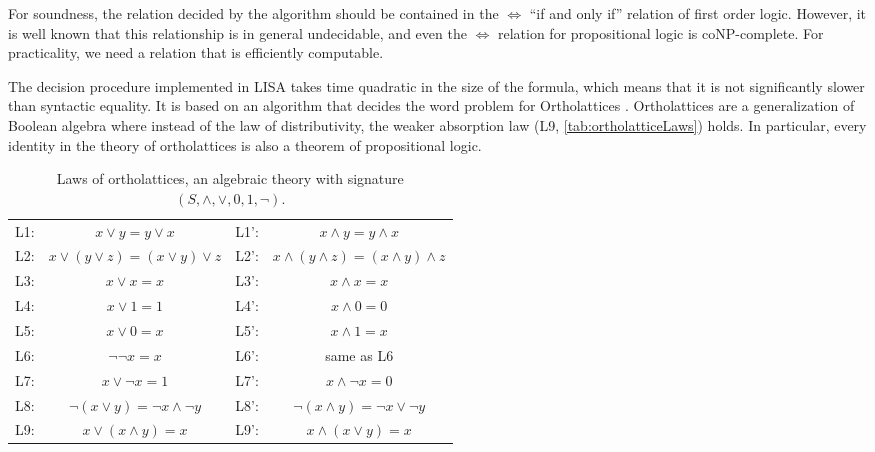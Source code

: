 For soundness, the relation decided by the algorithm should be contained in the $\iff$ ``if and only if'' relation of first order logic. However, it is well known that this relationship is in general undecidable, and even the $\iff$ relation for propositional logic is coNP-complete. For practicality, we need a relation that is efficiently computable.

The decision procedure implemented in LISA takes time quadratic in the size of the formula, which means that it is not significantly slower than syntactic equality.
It is based on an algorithm that decides the word problem for Ortholattices \cite{guilloudFormulaNormalizationsVerification2023}.
Ortholattices are a generalization of Boolean algebra where instead of the law of distributivity, the weaker absorption law (L9, \autoref{tab:ortholatticeLaws}) holds. In particular, every identity in the theory of ortholattices is also a theorem of propositional logic.
\begin{table}[bth]
  \centering
  \begin{tabular}{r c @{\hskip 2em} | @{\hskip 2em} r c}
    L1: & $x \lor y = y \lor x$                    & L1': & $x \land y = y \land x$                      \\
    L2: & $x \lor ( y \lor z) = (x \lor y) \lor z$ & L2': & $x \land ( y \land z) = (x \land y) \land z$ \\
    L3: & $x \lor x = x$                           & L3': & $x \land x = x$                              \\
    L4: & $x \lor 1 = 1$                           & L4': & $x \land 0 = 0$                              \\
    L5: & $x \lor 0 = x$                           & L5': & $x \land 1 = x$                              \\
    L6: & $\neg \neg x = x$                        & L6': & same as L6                                   \\
    L7: & $x \lor \neg x = 1$                      & L7': & $x \land \neg x = 0$                         \\
    L8: & $\neg (x \lor y) = \neg x \land \neg y$  & L8': & $\neg (x \land y) = \neg x \lor \neg y$      \\
    L9: & $x \lor (x \land y) = x$                 & L9': & $x \land (x \lor y) = x$                     \\
  \end{tabular}
  \caption{Laws of ortholattices, an algebraic theory with signature $(S, \land, \lor, 0, 1, \neg)$.}
  \label{tab:ortholatticeLaws}
\end{table}

